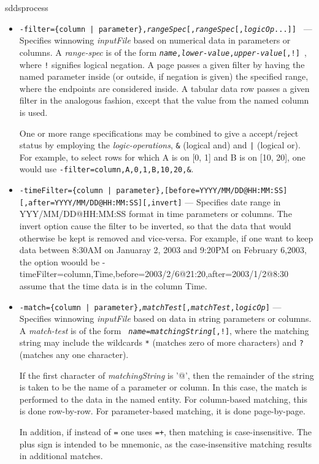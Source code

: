 \begin{sddsprog}{sddsprocess}
\begin{itemize}
   \begin{itemize}

   \item {\tt -filter=\{column | parameter\},{\em rangeSpec}[,{\em rangeSpec}[,{\em logicOp}...]] } ---
Specifies winnowing {\em inputFile} based on numerical data in parameters or columns.  A {\em range-spec} is of the
form {\tt {\em name},{\em lower-value},{\em upper-value}[,!] }, where \verb|!| signifies logical negation. A page
passes a given filter by having the named parameter inside (or outside, if negation is given) the specified range,
where the endpoints are considered inside.  A tabular data row passes a given filter in the analogous fashion, except
that the value from the named column is used.  

One or more range specifications may be combined to give a accept/reject status by employing the {\em
logic-operations}, \verb|&| (logical and) and \verb&|& (logical or).  For example, to select rows for
which A is on [0, 1] and B is on [10, 20], one would use
{\tt -filter=column,A,0,1,B,10,20,\&}.
        \item {\tt -timeFilter=\{column | parameter\},[before=YYYY/MM/DD@HH:MM:SS] [,after=YYYY/MM/DD@HH:MM:SS][,invert]} 
--- Specifies date range in YYY/MM/DD@HH:MM:SS format in time parameters or columns. The invert option cause the
filter to be inverted, so that the data that would otherwise be kept is removed and vice-versa. For example,
if one want to keep data between 8:30AM on Januaray 2, 2003 and 9:20PM on February 6,2003, the option woould be
     -timeFilter=column,Time,before=2003/2/6@21:20,after=2003/1/2@8:30
assume that the time data is in the column Time.

        \item {\tt -match=\{column | parameter\},{\em matchTest}[,{\em matchTest},{\em logicOp}]} --- Specifies
winnowing {\em inputFile} based on data in string parameters or columns.  A {\em match-test} is of the form {\tt {\em
name}={\em matchingString}[,!]}, where the matching string may include the wildcards \verb|*| (matches zero of more
characters) and \verb|?| (matches any one character). 

If the first character of {\em matchingString} is '@', then the remainder of the string is taken to be the name of a
parameter or column.  In this case, the match is performed to the data in the named entity.  For column-based matching,
this is done row-by-row.  For parameter-based matching, it is done page-by-page.

In addition, if instead of \verb|=| one uses \verb|=+|, then matching is case-insensitive.  The plus sign is intended
to be mnemonic, as the case-insensitive matching results in additional matches.


\end{itemize}
\end{itemize}
\end{sddsprog}
